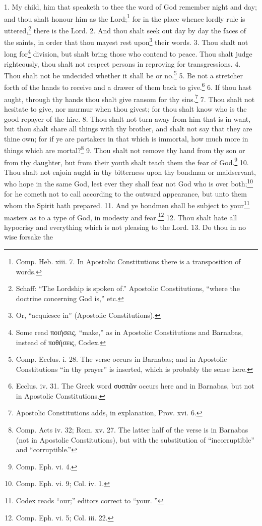 1. My child, him that speaketh to thee the word of God remember night and day; and thou shalt honour him as the Lord;\footnote{\par  Comp. Heb. xiii. 7. In Apostolic Constitutions there is a transposition of words.} for in the place whence lordly rule is uttered,\footnote{\par  Schaff: “The Lordship is spoken of.” Apostolic Constitutions, “where the doctrine concerning God is,” etc.} there is the Lord. 2. And thou shalt seek out day by day the faces of the saints, in order that thou mayest rest upon\footnote{\par  Or, “acquiesce in” (Apostolic Constitutions).} their words. 3. Thou shalt not long for\footnote{\par  Some read \textgreek{ποιήσεις}, “make,” as in Apostolic Constitutions and Barnabas, instead of \textgreek{ποθήσεις}, Codex.} division, but shalt bring those who contend to peace. Thou shalt judge righteously, thou shalt not respect persons in reproving for transgressions. 4. Thou shalt not be undecided whether it shall be or no.\footnote{\par  Comp. Ecclus. i. 28. The verse occurs in Barnabas; and in Apostolic Constitutions “in thy prayer” is inserted, which is probably the sense here.} 5. Be not a stretcher forth of the hands to receive and a drawer of them back to give.\footnote{\par  Ecclus. iv. 31. The Greek word \textgreek{συσπῶν} occurs here and in Barnabas, but not in Apostolic Constitutions.} 6. If thou hast aught, through thy hands thou shalt give ransom for thy sins.\footnote{\par  Apostolic Constitutions adds, in explanation, Prov. xvi. 6.} 7. Thou shalt not hesitate to give, nor murmur when thou givest; for thou shalt know who is the good repayer of the hire. 8. Thou shalt not turn away from him that is in want, but thou shalt share all things with thy brother, and shalt not say that they are thine own; for if ye are partakers in that which is immortal, how much more in things which are mortal?\footnote{\par  Comp. Acts iv. 32; Rom. xv. 27. The latter half of the verse is in Barnabas (not in Apostolic Constitutions), but with the substitution of “incorruptible” and “corruptible.”} 9. Thou shalt not remove thy hand from thy son or from thy daughter, but from their youth shalt teach them the fear of God.\footnote{\par  Comp. Eph. vi. 4.} 10. Thou shalt not enjoin aught in thy bitterness upon thy bondman or maidservant, who hope in the same God, lest ever they shall fear not God who is over both;\footnote{\par  Comp. Eph. vi. 9; Col. iv. 1.} for he cometh not to call according to the outward appearance, but unto them whom the Spirit hath prepared. 11. And ye bondmen shall be subject to your\footnote{\par  Codex reads “our;” editors correct to “your. ”} masters as to a type of God, in modesty and fear.\footnote{\par  Comp. Eph. vi. 5; Col. iii. 22.} 12. Thou shalt hate all hypocrisy and everything which is not pleasing to the Lord. 13. Do thou in no wise forsake the 